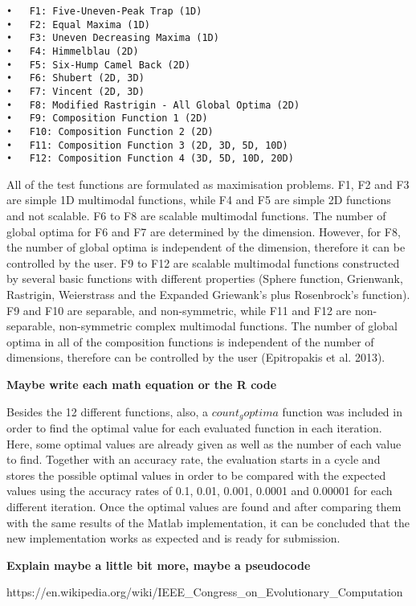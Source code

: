 \documentclass[12pt,a4paper]{article}
\begin{document}
\begin{verbatim}
•   F1: Five-Uneven-Peak Trap (1D)
•   F2: Equal Maxima (1D)
•   F3: Uneven Decreasing Maxima (1D)
•   F4: Himmelblau (2D)
•   F5: Six-Hump Camel Back (2D)
•   F6: Shubert (2D, 3D)
•   F7: Vincent (2D, 3D)
•   F8: Modified Rastrigin - All Global Optima (2D)
•   F9: Composition Function 1 (2D)
•   F10: Composition Function 2 (2D)
•   F11: Composition Function 3 (2D, 3D, 5D, 10D)
•   F12: Composition Function 4 (3D, 5D, 10D, 20D)
\end{verbatim}

All of the test functions are formulated as maximisation problems. F1,
F2 and F3 are simple 1D multimodal functions, while F4 and F5 are simple
2D functions and not scalable. F6 to F8 are scalable multimodal
functions. The number of global optima for F6 and F7 are determined by
the dimension. However, for F8, the number of global optima is
independent of the dimension, therefore it can be controlled by the
user. F9 to F12 are scalable multimodal functions constructed by several
basic functions with different properties (Sphere function, Grienwank,
Rastrigin, Weierstrass and the Expanded Griewank's plus Rosenbrock's
function). F9 and F10 are separable, and non-symmetric, while F11 and
F12 are non-separable, non-symmetric complex multimodal functions. The
number of global optima in all of the composition functions is
independent of the number of dimensions, therefore can be controlled by
the user (Epitropakis et al. 2013).

\textbf{Maybe write each math equation or the R code}

Besides the 12 different functions, also, a \(count_goptima\) function
was included in order to find the optimal value for each evaluated
function in each iteration. Here, some optimal values are already given
as well as the number of each value to find. Together with an accuracy
rate, the evaluation starts in a cycle and stores the possible optimal
values in order to be compared with the expected values using the
accuracy rates of 0.1, 0.01, 0.001, 0.0001 and 0.00001 for each
different iteration. Once the optimal values are found and after
comparing them with the same results of the Matlab implementation, it
can be concluded that the new implementation works as expected and is
ready for submission.

\textbf{Explain maybe a little bit more, maybe a pseudocode}

https://en.wikipedia.org/wiki/IEEE\_Congress\_on\_Evolutionary\_Computation
\end{document}
